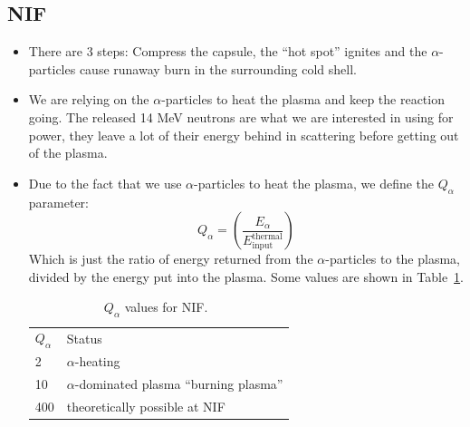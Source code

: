 \documentclass[letter]{article}
\begin{document}
\subsection{NIF}
\begin{itemize}
\item There are 3 steps: Compress the capsule, the ``hot spot''
  ignites and the $\alpha$-particles cause runaway burn in the
  surrounding cold shell.~\cite[Lec. 29]{lecture}
\item We are relying on the $\alpha$-particles to heat the plasma and
  keep the reaction going. The released 14 MeV neutrons are what we
  are interested in using for power, they leave a lot of their energy
  behind in scattering before getting out of the
  plasma.~\cite[Lec. 29]{lecture}
\item Due to the fact that we use $\alpha$-particles to heat the
  plasma, we define the $Q_\alpha$ parameter:
  \begin{equation*}
    Q_\alpha = \left(\frac{E_\alpha}{E^{\text{thermal}}_{\text{input}}}\right)
  \end{equation*}
Which is just the ratio of energy returned from the $\alpha$-particles
to the plasma, divided by the energy put into the plasma. Some values
are shown in Table~\ref{tab:q-alpha}.
\begin{table}[hbtp]
\centering
\begin{tabular}{ll}
$Q_\alpha$ &  Status\\
2 & $\alpha$-heating \\
10 & $\alpha$-dominated plasma ``burning plasma'' \\
400 & theoretically possible at NIF
\end{tabular}
\caption{$Q_\alpha$ values for NIF.~\cite[Lec. 29]{lecture}}
\label{tab:q-alpha}
\end{table}

\end{itemize}



\end{document}
